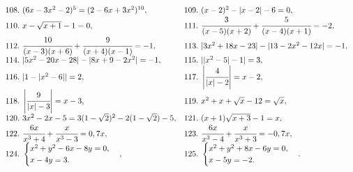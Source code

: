 $\begin{array}{ll}
108.\ (6x-3x^2-2)^5=(2-6x+3x^2)^{10},&
109.\ (x-2)^2-|x-2|-6=0,\\
110.\ x-\sqrt{x+1}-1=0,&
111.\ \cfrac{3}{(x-5)(x+2)}+\cfrac{5}{(x-4)(x+1)}=-2,\\
112.\ \cfrac{10}{(x-3)(x+6)}+\cfrac{9}{(x+4)(x-1)}=-1,&
113.\ |3x^2+18x-23|-|13-2x^2-12x|=-1,\\
114.\ |5x^2-20x-28|-|8x+9-2x^2|=-1,&
115.\ ||x^2-5|-1|=3,\\
116.\ |1-|x^2-6||=2,&
117.\ \left|\cfrac{4}{|x|-2}\right|=x-2,\\
118.\ \left|\cfrac{9}{|x|-3}\right|=x-3,&
119.\ x^2+x+\sqrt{x}-12=\sqrt{x},\\
120.\ 3x^2-2x-5=3(1-\sqrt{2})^2-2(1-\sqrt{2})-5,&
121.\ (x+1)\sqrt{x+3}-1=x,\\
122.\ \cfrac{6x}{x^3+4}+\cfrac{x}{x^3-3}=0,7x,&
123.\ \cfrac{6x}{x^3-4}+\cfrac{x}{x^3+3}=-0,7x,\\
124.\ \begin{cases} x^2+y^2-6x-8y=0,\\ x-4y=3.\end{cases},&
125.\ \begin{cases} x^2+y^2+8x-6y=0,\\ x-5y=-2.\end{cases}.
\end{array}$
\newpage
